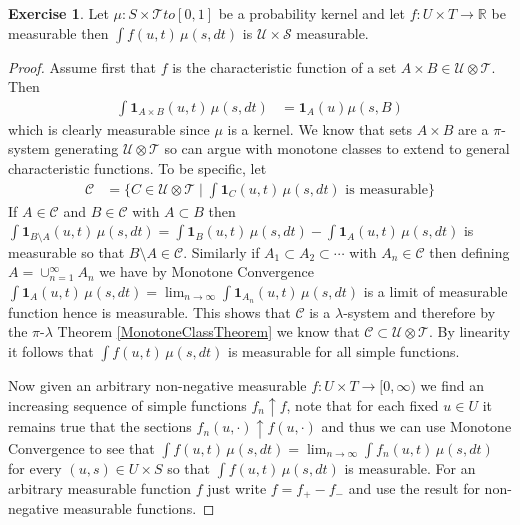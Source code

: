 \documentclass{amsbook}
\theoremstyle{definition}
\newtheorem{xca}{Exercise}
\theoremstyle{remark}
\newcommand{\characteristic}[1]{\textbf{1}_{#1}}
\newcommand{\reals}{\mathbb{R}}
\begin{document}
\begin{xca}\label{MeasurabilityKernelExtraParameter}Let $\mu : S \times \mathcal{T} to [0,1]$ be a probability kernel and let $f : U \times T \to \reals$ be measurable then $\int f(u, t) \, \mu(s, dt)$ is $\mathcal{U} \times \mathcal{S}$ measurable.
\end{xca}
\begin{proof}
Assume first that $f$ is the characteristic function of a set $A \times B \in \mathcal{U} \otimes \mathcal{T}$.  Then 
\begin{align*}
\int \characteristic{ A\times B} (u, t) \, \mu(s, dt) &= \characteristic{A}(u) \mu(s, B)
\end{align*}
which is clearly measurable since $\mu$ is a kernel.  We know that sets $A \times B$ are a $\pi$-system generating $\mathcal{U} \otimes \mathcal{T}$ so can argue with monotone classes to extend to general characteristic functions.  To be specific, let 
\begin{align*}
\mathcal{C} &= \lbrace C \in \mathcal{U} \otimes \mathcal{T}  \mid \int \characteristic{C}(u,t) \, \mu(s,dt) \text{ is measurable} \rbrace
\end{align*}
If $A \in \mathcal{C}$ and $B \in \mathcal{C}$ with $A \subset B$ then 
$\int \characteristic{ B \setminus A} (u, t) \, \mu(s, dt) = \int \characteristic{ B } (u, t) \, \mu(s, dt) - \int \characteristic{A} (u, t) \, \mu(s, dt)$ is measurable so that $B \setminus A \in \mathcal{C}$.  Similarly if $A_1 \subset A_2 \subset \dotsb$ with $A_n \in \mathcal{C}$ then defining $A = \cup_{n=1}^\infty A_n$ we have by Monotone Convergence 
$\int \characteristic{A}(u,t) \, \mu(s, dt) = \lim_{n \to \infty} \int \characteristic{A_n}(u,t) \, \mu(s, dt)$ is a limit of measurable function hence is measurable.  This shows that $\mathcal{C}$ is a $\lambda$-system and therefore by the $\pi$-$\lambda$ Theorem \ref{MonotoneClassTheorem} we know that $\mathcal{C} \subset \mathcal{U}\otimes \mathcal{T}$.  By linearity it follows that $\int f(u,t) \, \mu(s, dt)$ is measurable for all simple functions.

Now given an arbitrary non-negative measurable $f : U \times T \to [0,\infty)$ we find an increasing sequence of simple functions $f_n \uparrow f$, note that for each fixed $u \in U$ it remains true that the sections $f_n(u, \cdot) \uparrow f(u, \cdot)$ and thus we can use Monotone Convergence to see that $\int f(u,t) \, \mu(s,dt) = \lim_{n \to \infty} \int f_n(u,t) \, \mu(s,dt)$ for every $(u,s) \in U \times S$ so that $\int f(u,t) \, \mu(s,dt)$ is measurable.  For an arbitrary measurable function $f$ just write $f = f_+ - f_-$ and use the result for non-negative measurable functions.
\end{proof}
\end{document}
